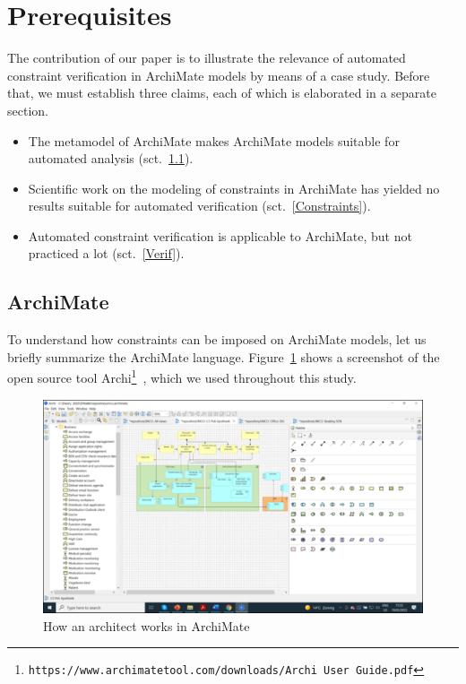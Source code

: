 \documentclass[sn-vancouver]{sn-jnl}%
\theoremstyle{thmstyleone}%
\theoremstyle{thmstyletwo}%
\theoremstyle{thmstylethree}%
\begin{document}
\section{Prerequisites}\label{Prerequisites}
The contribution of our paper is to illustrate the relevance of automated constraint verification in ArchiMate models by means of a case study.
Before that, we must establish three claims, each of which is elaborated in a separate section.
\begin{itemize}
   \item The metamodel of ArchiMate makes ArchiMate models suitable for automated analysis (sct.~\ref{ArchiMate}).
   \item Scientific work on the modeling of constraints in ArchiMate has yielded no results suitable for automated verification (sct.~\ref{Constraints}).
   \item Automated constraint verification is applicable to ArchiMate, but not practiced a lot (sct.~\ref{Verif}).
\end{itemize}

\subsection{ArchiMate}\label{ArchiMate}
To understand how constraints can be imposed on ArchiMate models,
let us briefly summarize the ArchiMate language.
Figure~\ref{how} shows a screenshot of the open source tool Archi\footnote{\tt\tiny https://www.archimatetool.com/downloads/Archi User Guide.pdf}~\cite{Archi}, which we used throughout this study.

\begin{figure}[b]
 \centering
\includegraphics[clip=true, scale=0.5]{HowArchitectWorks}
\caption{How an architect works in ArchiMate}
\label{how}   %
\end{figure}
\end{document}
